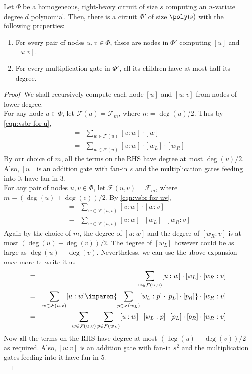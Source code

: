 \begin{theorem}\label{thm:vsbr-with-structure}
Let $\Phi$ be a homogeneous, right-heavy circuit of size $s$ computing an $n$-variate degree $d$ polynomial. 
Then, there is a circuit $\Phi'$ of size $\poly(s)$ with the following properties:
\begin{enumerate}
\item For every pair of nodes  $u,v\in \Phi$, there are nodes in $\Phi'$ computing $[u]$ and $[u:v]$.
\item For every multiplication gate in $\Phi'$, all its children have at most half its degree. 
\end{enumerate}
\end{theorem}
\begin{proof}
  We shall recursively compute each node $[u]$ and $[u:v]$ from nodes of lower degree. \\

  \noindent
  For any node $u\in \Phi$, let $\mathcal{F}(u) = \mathcal{F}_m$, where
  $m = \deg(u)/2$. 
Thus by \eqref{eqn:vsbr-for-u},
  \begin{eqnarray*}
    [u] & = & \sum_{w\in \mathcal{F}(u)} [u:w] \cdot [w]\\ 
    & = & \sum_{w\in \mathcal{F}(u)} [u:w] \cdot [w_L] \cdot [w_R]
  \end{eqnarray*}
  By our choice of $m$, all the terms on the RHS have degree at most
  $\deg(u)/2$. 
Also, $[u]$ is an addition gate with fan-in $s$ and the
  multiplication gates feeding into it have fan-in $3$.\\
  
  \noindent
  For any pair of nodes $u,v\in \Phi$, let $\mathcal{F}(u,v) =
  \mathcal{F}_m$, where $m = (\deg(u) + \deg(v))/2$. 
By
  \eqref{eqn:vsbr-for-uv},
  \begin{eqnarray*}
    [u:v] & = & \sum_{w\in \mathcal{F}(u,v)} [u:w] \cdot [w:v]\\ 
    & = & \sum_{w\in \mathcal{F}(u,v)} [u:w] \cdot [w_L] \cdot [w_R:v]
  \end{eqnarray*}
  Again by the choice of $m$, the degree of $[u:w]$ and the degree of
  $[w_R:v]$ is at most $(\deg(u) - \deg(v))/2$. 
The degree of $[w_L]$
  however could be as large as $\deg(u) - \deg(v)$. 
Nevertheless, we can
  use the above expansion once more to write it as
  \begin{eqnarray*}
    [u:v] & = & \sum_{w\in \mathcal{F}(u,v)} [u:w] \cdot [w_L] \cdot [w_R:v]\\
    & = & \sum_{w\in \mathcal{F}(u,v)} [u:w] \inparen{\sum_{p \in \mathcal{F}(w_L)} [w_L:p] \cdot [p_L] \cdot [p_R]}\cdot [w_R:v]\\
    & = & \sum_{w\in \mathcal{F}(u,v)}\sum_{p\in \mathcal{F}(w_L)} [u:w] \cdot  [w_L:p] \cdot [p_L] \cdot [p_R]\cdot [w_R:v]
  \end{eqnarray*}
  Now all the terms on the RHS have degree at most $(\deg(u) -
  \deg(v))/2$ as required. 
Also, $[u:v]$ is an addition gate with fan-in
  $s^2$ and the multiplication gates feeding into it have fan-in $5$.\\
  

\end{proof}
